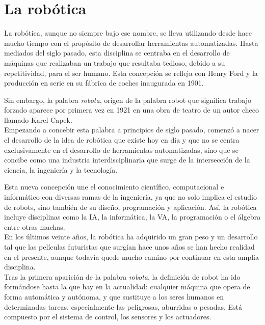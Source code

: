 
\section{La robótica}
\label{sec:robotica}
La robótica, aunque no siempre bajo ese nombre, se lleva utilizando desde hace mucho tiempo con el propósito de desarrollar herramientas automatizadas.
Hasta mediados del siglo pasado, esta disciplina se centraba en el desarrollo de máquinas que realizaban un trabajo que resultaba tedioso, debido a su repetitividad, para el ser humano. Esta concepción se refleja con Henry Ford y la producción en serie en su fábrica de coches inaugurada en 1901.

Sin embargo, la palabra \textit{robota}, origen de la palabra robot que significa trabajo forzado aparece por primera vez en 1921 en una obra de teatro de un autor checo llamado Karel Capek.\\

Empezando a concebir esta palabra a principios de siglo pasado, comenzó a nacer el desarrollo de la idea de robótica que existe hoy en día y que no se centra exclusivamente en el desarrollo de herramientas automatizadas, sino que se concibe como una industria interdisciplinaria que surge de la intersección de la ciencia, la ingeniería y la tecnología.

Esta nueva concepción une el conocimiento científico, computacional e informático con diversas ramas de la ingeniería, ya que no solo implica el estudio de robots, sino también de su diseño, programación y aplicación. Así, la robótica incluye disciplinas como la IA, la informática, la VA, la programación o el álgebra entre otras muchas.\\

En los últimos veinte años, la robótica ha adquirido un gran peso y un desarrollo tal que las películas futuristas que surgían hace unos años se han hecho realidad en el presente, aunque todavía quede mucho camino por continuar en esta amplia disciplina.\\

Tras la primera aparición de la palabra \textit{robota}, la definición de robot ha ido formándose hasta la que hay en la actualidad:  cualquier máquina que opera de forma automática y autónoma, y que sustituye a los seres humanos en determinadas tareas, especialmente las peligrosas, aburridas o pesadas. Está compuesto por el sistema de control, los sensores y los actuadores.


